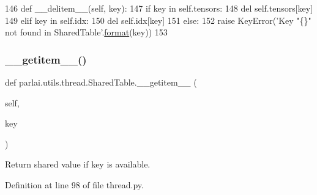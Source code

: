 \begin{DoxyCode}
146     \textcolor{keyword}{def }\_\_delitem\_\_(self, key):
147         \textcolor{keywordflow}{if} key \textcolor{keywordflow}{in} self.tensors:
148             del self.tensors[key]
149         \textcolor{keywordflow}{elif} key \textcolor{keywordflow}{in} self.idx:
150             del self.idx[key]
151         \textcolor{keywordflow}{else}:
152             \textcolor{keywordflow}{raise} KeyError(\textcolor{stringliteral}{'Key "\{\}" not found in SharedTable'}.\hyperlink{namespaceparlai_1_1chat__service_1_1services_1_1messenger_1_1shared__utils_a32e2e2022b824fbaf80c747160b52a76}{format}(key))
153 
\end{DoxyCode}
\mbox{\label{classparlai_1_1utils_1_1thread_1_1SharedTable_a624b898ff3294a8be69ad796640cc7ee}} 
\subsubsection{\texorpdfstring{\+\_\+\+\_\+getitem\+\_\+\+\_\+()}{\_\_getitem\_\_()}}
{\footnotesize\ttfamily def parlai.\+utils.\+thread.\+Shared\+Table.\+\_\+\+\_\+getitem\+\_\+\+\_\+ (\begin{DoxyParamCaption}\item[{}]{self,  }\item[{}]{key }\end{DoxyParamCaption})}

\begin{DoxyVerb}Return shared value if key is available.
\end{DoxyVerb}
 

Definition at line 98 of file thread.\+py.



